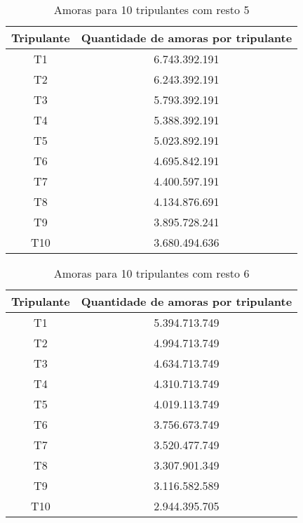 \documentclass[12pt]{article}
\begin{document}
\begin{table}[H]

\centering

\begin{tabular}{|c|c|}

\hline
Tripulante & Quantidade de amoras por tripulante \\
\hline
T1 & 6.743.392.191 \\
\hline
T2 & 6.243.392.191 \\
\hline
T3 & 5.793.392.191 \\
\hline
T4 & 5.388.392.191 \\
\hline
T5 & 5.023.892.191 \\
\hline
T6 & 4.695.842.191 \\
\hline
T7 & 4.400.597.191 \\
\hline
T8 & 4.134.876.691 \\
\hline
T9 & 3.895.728.241 \\
\hline
T10 & 3.680.494.636 \\
\hline

\end{tabular}
\label{Tabela21}
\caption{Amoras para 10 tripulantes com resto 5}

\end{table}

\begin{table}[H]

\centering

\begin{tabular}{|c|c|}

\hline
Tripulante & Quantidade de amoras por tripulante \\
\hline
T1 & 5.394.713.749 \\
\hline
T2 & 4.994.713.749 \\
\hline
T3 & 4.634.713.749 \\
\hline
T4 & 4.310.713.749 \\
\hline
T5 & 4.019.113.749 \\
\hline
T6 & 3.756.673.749 \\
\hline
T7 & 3.520.477.749 \\
\hline
T8 & 3.307.901.349 \\
\hline
T9 & 3.116.582.589 \\
\hline
T10 & 2.944.395.705 \\
\hline

\end{tabular}
\label{Tabela22}
\caption{Amoras para 10 tripulantes com resto 6}

\end{table}
\end{document}

